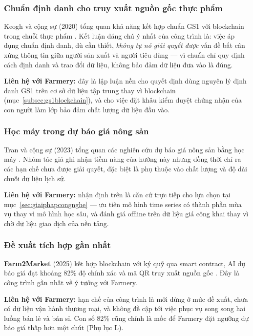 \subsubsection*{Chuẩn định danh cho truy xuất nguồn gốc thực phẩm}

Keogh và cộng sự (2020) tổng quan khả năng kết hợp chuẩn GS1 với blockchain trong chuỗi thực phẩm \parencite{keogh2020blockchain}. Kết luận đáng chú ý nhất của công trình là: việc áp dụng chuẩn định danh, dù cần thiết, \emph{không tự nó giải quyết được} vấn đề bất cân xứng thông tin giữa người sản xuất và người tiêu dùng --- vì chuẩn chỉ quy định cách định danh và trao đổi dữ liệu, không bảo đảm dữ liệu đưa vào là đúng.

\textbf{Liên hệ với Farmery:} đây là lập luận nền cho quyết định dùng nguyên lý định danh GS1 trên cơ sở dữ liệu tập trung thay vì blockchain (mục~\ref{subsec:gs1blockchain}), và cho việc đặt khâu kiểm duyệt chứng nhận của con người làm lớp bảo đảm chất lượng dữ liệu đầu vào.

\subsubsection*{Học máy trong dự báo giá nông sản}

Tran và cộng sự (2023) tổng quan các nghiên cứu dự báo giá nông sản bằng học máy \parencite{tran2023pricepredict}. Nhóm tác giả ghi nhận tiềm năng của hướng này nhưng đồng thời chỉ ra các hạn chế chưa được giải quyết, đặc biệt là phụ thuộc vào chất lượng và độ dài chuỗi dữ liệu lịch sử.

\textbf{Liên hệ với Farmery:} nhận định trên là căn cứ trực tiếp cho lựa chọn tại mục~\ref{sec:giaiphapcongnghe} --- ưu tiên mô hình time series có thành phần mùa vụ thay vì mô hình học sâu, và đánh giá offline trên dữ liệu giá công khai thay vì chờ dữ liệu giao dịch của nền tảng.

\subsubsection*{Đề xuất tích hợp gần nhất}

\textbf{Farm2Market} (2025) kết hợp blockchain với ký quỹ qua smart contract, AI dự báo giá đạt khoảng 82\% độ chính xác và mã QR truy xuất nguồn gốc \parencite{farm2market_2025}. Đây là công trình gần nhất về ý tưởng với Farmery.

\textbf{Liên hệ với Farmery:} hạn chế của công trình là mới dừng ở mức đề xuất, chưa có dữ liệu vận hành thương mại, và không đề cập tới việc phục vụ song song hai luồng bán lẻ và bán sỉ. Con số 82\% cũng chính là mốc để Farmery đặt ngưỡng dự báo giá thấp hơn một chút (Phụ lục L).

